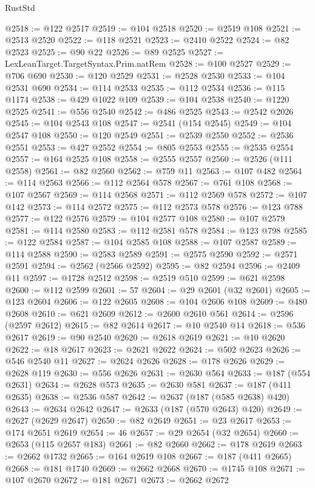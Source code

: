 \begin{lexlean}{RustStd}
\begin{coremodule}
{\begin{coremodule}
{{{{{{{{{{{{{{{{{{{{{{{{{{{{{{{{{{{{{{{{{{{{{{{{{{{{{{{@2518 := @122 @2517
@2519 := @104 @2518
@2520 := @2519 @108
@2521 := @2513 @2520
@2522 := @118 @2521
@2523 := @2410 @2522
@2524 := @82 @2523
@2525 := @90 @22
@2526 := @89 @2525
@2527 := LexLeanTarget.TargetSyntax.Prim.natRem
@2528 := @100 @2527
@2529 := @706 @690
@2530 := @120 @2529
@2531 := @2528 @2530
@2533 := @104 @2531 @690
@2534 := @114 @2533
@2535 := @112 @2534
@2536 := @115 @1174
@2538 := @429 @1022 @109
@2539 := @104 @2538
@2540 := @1220 @2525
@2541 := @556 @2540
@2542 := @486 @2525
@2543 := @2542 @2026
@2545 := @104 @2543 @108
@2547 := @2541 (@154 @2545)
@2549 := @104 @2547 @108
@2550 := @120 @2549
@2551 := @2539 @2550
@2552 := @2536 @2551
@2553 := @427 @2552
@2554 := @805 @2553
@2555 := @2535 @2554
@2557 := @164 @2525 @108
@2558 := @2555 @2557
@2560 := @2526 (@111 @2558)
@2561 := @82 @2560
@2562 := @759 @11
@2563 := @107 @482
@2564 := @114 @2563
@2566 := @112 @2564 @578
@2567 := @761 @108
@2568 := @107 @2567
@2569 := @114 @2568
@2571 := @112 @2569 @578
@2572 := @107 @142
@2573 := @114 @2572
@2575 := @112 @2573 @578
@2576 := @123 @788
@2577 := @122 @2576
@2579 := @104 @2577 @108
@2580 := @107 @2579
@2581 := @114 @2580
@2583 := @112 @2581 @578
@2584 := @123 @798
@2585 := @122 @2584
@2587 := @104 @2585 @108
@2588 := @107 @2587
@2589 := @114 @2588
@2590 := @2583 @2589
@2591 := @2575 @2590
@2592 := @2571 @2591
@2594 := @2562 (@2566 @2592)
@2595 := @82 @2594
@2596 := @2409 @11
@2597 := @1728 @2512
@2598 := @2519 @510
@2599 := @621 @2598
@2600 := @112 @2599
@2601 := 57
@2604 := @29 @2601 (@32 @2601)
@2605 := @123 @2604
@2606 := @122 @2605
@2608 := @104 @2606 @108
@2609 := @480 @2608
@2610 := @621 @2609
@2612 := @2600 @2610 @561
@2614 := @2596 (@2597 @2612)
@2615 := @82 @2614
@2617 := @10 @2540 @14
@2618 := @536 @2617
@2619 := @90 @2540
@2620 := @2618 @2619
@2621 := @10 @2620
@2622 := @18 @2617
@2623 := @2621 @2622
@2624 := @502 @2623
@2626 := @546 @2540 @11
@2627 := @2624 @2626
@2628 := @178 @2626
@2629 := @2628 @119
@2630 := @556 @2626
@2631 := @2630 @564
@2633 := @187 (@554 @2631)
@2634 := @2628 @573
@2635 := @2630 @581
@2637 := @187 (@411 @2635)
@2638 := @2536 @587
@2642 := @2637 (@187 (@585 @2638) @420)
@2643 := @2634 @2642
@2647 := @2633 (@187 (@570 @2643) @420)
@2649 := @2627 (@2629 @2647)
@2650 := @82 @2649
@2651 := @23 @2617
@2653 := @174 @2651 @2619
@2654 := 46
@2657 := @29 @2654 (@32 @2654)
@2660 := @2653 (@115 @2657 @183)
@2661 := @82 @2660
@2662 := @178 @2619
@2663 := @2662 @1732
@2665 := @164 @2619 @108
@2667 := @187 (@411 @2665)
@2668 := @181 @1740
@2669 := @2662 @2668
@2670 := @1745 @108
@2671 := @107 @2670
@2672 := @181 @2671
@2673 := @2662 @2672
}}}}}}}}}}}}}}}}}}}}}}}}}}}}}}}}}}}}}}}}}}}}}}}}}}}}}}}
\end{coremodule}}
\end{coremodule}
\end{lexlean}
